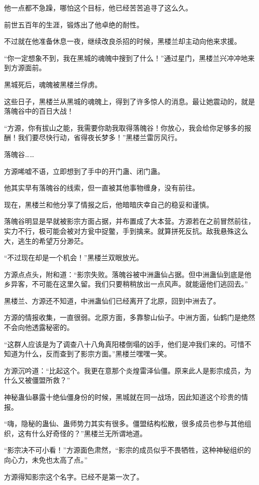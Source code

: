 \begin{this_body}
他一点都不急躁，哪怕这个目标，他已经苦苦追寻了这么久。

前世五百年的生涯，锻炼出了他卓绝的耐性。

不过就在他准备休息一夜，继续改良杀招的时候，黑楼兰却主动向他来求援。

“你一定想象不到，我在黑城的魂魄中搜到了什么！”通过星门，黑楼兰兴冲冲地来到方源面前。

黑城死后，魂魄被黑楼兰俘虏。

这些日子，黑楼兰从黑城的魂魄上，得到了许多惊人的消息。最让她震动的，就是落魄谷中的百日大战！

“方源，你有拔山之能，我需要你助我取得落魄谷！你放心，我会给你足够多的报酬！我们要尽快行动，省得夜长梦多！”黑楼兰雷厉风行。

落魄谷……

方源唏嘘不语，立即想到了手中的开门蛊、闭门蛊。

他其实早有落魄谷的线索，但一直被其他事物缠身，没有前往。

现在，黑楼兰和他分享了情报之后，他暗暗庆幸自己的稳妥和谨慎。

落魄谷明显是早就被影宗方面占据，并布置成了大本营。方源若在之前冒然前往，实力不行，极可能会被对方瓮中捉鳖，手到擒来。就算拼死反抗。敌我悬殊这么大，逃生的希望万分渺茫。

“不过现在却是一个机会！”黑楼兰双眼放光。

方源点点头，附和道：“影宗失败。落魄谷被中洲蛊仙占据。但中洲蛊仙到底是他乡异客，不可能在这里久留。我们只要稍稍放出一点风声。就能逼他们逃回去。”

黑楼兰、方源还不知道，中洲蛊仙们已经离开了北原，回到中洲去了。

方源的情报收集，一直很弱。北原方面，多靠黎山仙子。中洲方面，仙鹤门是绝然不会向他透露秘密的。

“这群人应该是为了调查八十八角真阳楼倒塌的凶手，他们是冲我们来的。可惜不知道为什么，反而查到了影宗方面。”黑楼兰嘿嘿一笑。

方源沉吟道：“比起这个。我更在意那个炎煌雷泽仙僵。原来此人是影宗成员，为什么又被僵盟所救？”

神秘蛊仙暴露十绝仙僵身份的时候，黑城就在同一战场，因此知道这个珍贵的情报。

“嗨，隐秘的蛊仙、蛊师势力其实有很多。僵盟结构松散，很多成员也参与其他组织，这有什么好奇怪的？”黑楼兰无所谓地道。

“影宗决不可小看！”方源面色肃然，“影宗的成员似乎不畏牺牲，这种神秘组织的向心力，未免也太高了点。”

方源得知影宗这个名字。已经不是第一次了。


\end{this_body}
